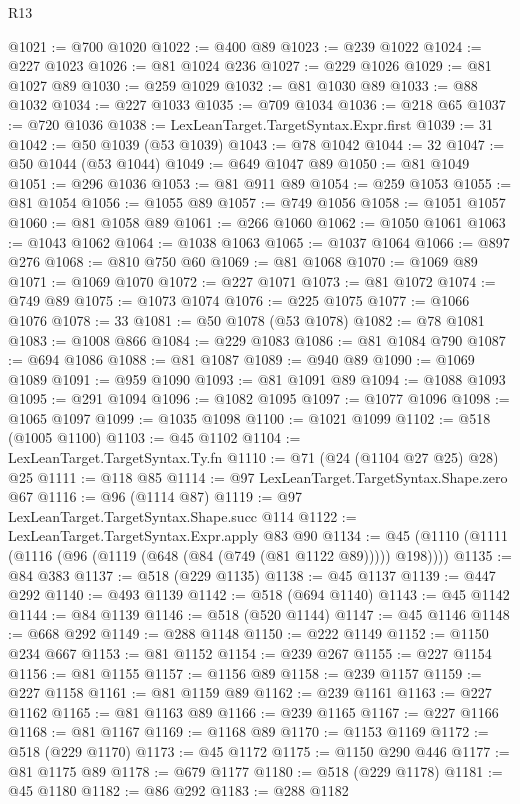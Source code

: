 \begin{lexlean}{R13}
\begin{coremodule}
@1021 := @700 @1020
@1022 := @400 @89
@1023 := @239 @1022
@1024 := @227 @1023
@1026 := @81 @1024 @236
@1027 := @229 @1026
@1029 := @81 @1027 @89
@1030 := @259 @1029
@1032 := @81 @1030 @89
@1033 := @88 @1032
@1034 := @227 @1033
@1035 := @709 @1034
@1036 := @218 @65
@1037 := @720 @1036
@1038 := LexLeanTarget.TargetSyntax.Expr.first
@1039 := 31
@1042 := @50 @1039 (@53 @1039)
@1043 := @78 @1042
@1044 := 32
@1047 := @50 @1044 (@53 @1044)
@1049 := @649 @1047 @89
@1050 := @81 @1049
@1051 := @296 @1036
@1053 := @81 @911 @89
@1054 := @259 @1053
@1055 := @81 @1054
@1056 := @1055 @89
@1057 := @749 @1056
@1058 := @1051 @1057
@1060 := @81 @1058 @89
@1061 := @266 @1060
@1062 := @1050 @1061
@1063 := @1043 @1062
@1064 := @1038 @1063
@1065 := @1037 @1064
@1066 := @897 @276
@1068 := @810 @750 @60
@1069 := @81 @1068
@1070 := @1069 @89
@1071 := @1069 @1070
@1072 := @227 @1071
@1073 := @81 @1072
@1074 := @749 @89
@1075 := @1073 @1074
@1076 := @225 @1075
@1077 := @1066 @1076
@1078 := 33
@1081 := @50 @1078 (@53 @1078)
@1082 := @78 @1081
@1083 := @1008 @866
@1084 := @229 @1083
@1086 := @81 @1084 @790
@1087 := @694 @1086
@1088 := @81 @1087
@1089 := @940 @89
@1090 := @1069 @1089
@1091 := @959 @1090
@1093 := @81 @1091 @89
@1094 := @1088 @1093
@1095 := @291 @1094
@1096 := @1082 @1095
@1097 := @1077 @1096
@1098 := @1065 @1097
@1099 := @1035 @1098
@1100 := @1021 @1099
@1102 := @518 (@1005 @1100)
@1103 := @45 @1102
@1104 := LexLeanTarget.TargetSyntax.Ty.fn
@1110 := @71 (@24 (@1104 @27 @25) @28) @25
@1111 := @118 @85
@1114 := @97 LexLeanTarget.TargetSyntax.Shape.zero @67
@1116 := @96 (@1114 @87)
@1119 := @97 LexLeanTarget.TargetSyntax.Shape.succ @114
@1122 := LexLeanTarget.TargetSyntax.Expr.apply @83 @90
@1134 := @45 (@1110 (@1111 (@1116 (@96 (@1119 (@648 (@84 (@749 (@81 @1122 @89))))) @198))))
@1135 := @84 @383
@1137 := @518 (@229 @1135)
@1138 := @45 @1137
@1139 := @447 @292
@1140 := @493 @1139
@1142 := @518 (@694 @1140)
@1143 := @45 @1142
@1144 := @84 @1139
@1146 := @518 (@520 @1144)
@1147 := @45 @1146
@1148 := @668 @292
@1149 := @288 @1148
@1150 := @222 @1149
@1152 := @1150 @234 @667
@1153 := @81 @1152
@1154 := @239 @267
@1155 := @227 @1154
@1156 := @81 @1155
@1157 := @1156 @89
@1158 := @239 @1157
@1159 := @227 @1158
@1161 := @81 @1159 @89
@1162 := @239 @1161
@1163 := @227 @1162
@1165 := @81 @1163 @89
@1166 := @239 @1165
@1167 := @227 @1166
@1168 := @81 @1167
@1169 := @1168 @89
@1170 := @1153 @1169
@1172 := @518 (@229 @1170)
@1173 := @45 @1172
@1175 := @1150 @290 @446
@1177 := @81 @1175 @89
@1178 := @679 @1177
@1180 := @518 (@229 @1178)
@1181 := @45 @1180
@1182 := @86 @292
@1183 := @288 @1182

\end{coremodule}
\end{lexlean}
